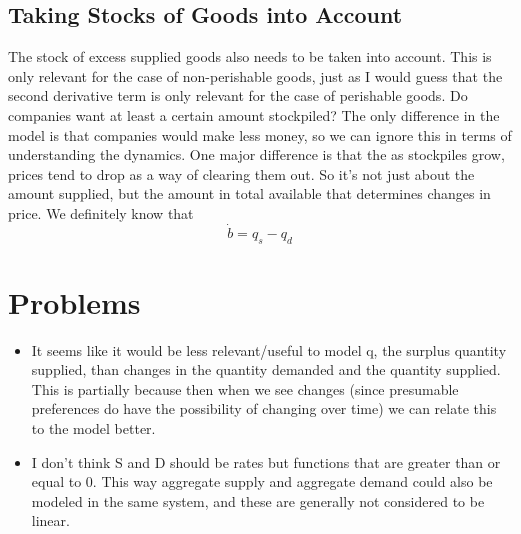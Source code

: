 \documentclass{article}
\begin{document}
\subsection{Taking Stocks of Goods into Account}
The stock of excess supplied goods also needs to be taken into account. This is only relevant for the case of non-perishable goods, just as I would guess that the second derivative term is only relevant for the case of perishable goods. Do companies want at least a certain amount stockpiled? The only difference in the model is that companies would make less money, so we can ignore this in terms of understanding the dynamics. One major difference is that the as stockpiles grow, prices tend to drop as a way of clearing them out. So it's not just about the amount supplied, but the amount in total available that determines changes in price. We definitely know that 
\begin{equation*}
	\dot{b} = q_s - q_d
\end{equation*}



\section{Problems}
\begin{itemize}
	\item It seems like it would be less relevant/useful to model q, the surplus quantity supplied, than changes in the quantity demanded and the quantity supplied. This is partially because then when we see changes (since presumable preferences do have the possibility of changing over time) we can relate this to the model better.
	\item I don't think S and D should be rates but functions that are greater than or equal to 0. This way aggregate supply and aggregate demand could also be modeled in the same system, and these are generally not considered to be linear.
\end{itemize}
\end{document}
